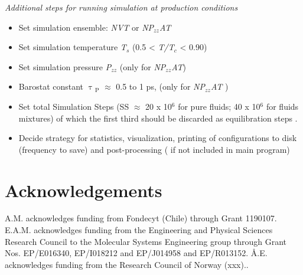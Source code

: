 \documentclass{scrbook}
\begin{document}

\textit{Additional steps for running simulation at production conditions}
\begin{itemize}
\item Set simulation ensemble: \textit{NVT} or \textit{NP}$_{zz}$\textit{AT} \\
\item Set simulation temperature \textit{T}$_{s}$ (0.5 {\textless} \textit{T/T}$_{c}$ {\textless} 0.90)  \\
\item Set simulation pressure \textit{P}$_{zz}$ (only for \textit{NP}$_{zz}$\textit{AT}) \\
\item Barostat constant ${\uptau}$$_{\mathrm{P}}$ ${\approx}$ 0.5 to 1 ps, (only for \textit{NP}$_{zz}$\textit{AT} ) \\
\item Set total Simulation Steps (SS ${\approx}$ 20 x 10$^{6}$ for pure fluids; 40 x 10$^{6}$ for fluids mixtures) of which the first third should be discarded as equilibration steps . \\
\item Decide strategy for statistics, visualization, printing of configurations to disk (frequency to save) and post-processing ( if not included in main program)   \\
\end{itemize}

\chapter*{Acknowledgements} 
A.M. acknowledges funding from Fondecyt (Chile) through Grant 1190107. E.A.M.
acknowledges funding from the Engineering and Physical Sciences Research
Council to the Molecular Systems Engineering group through Grant Nos.
\colorbox{color-1}{EP/E016340, EP/I018212} and EP/J014958 and EP/R013152.
\AA{}.E. acknowledges funding from \colorbox{color-1}{the Research Council of
Norway (xxx)..} 

\nocite{*}


\end{document}
